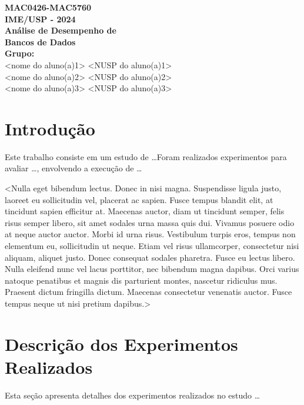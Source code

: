 \documentclass[12pt,a4paper]{article}
\begin{document}
\begin{titlepage}
    \centering
    \vspace*{\fill}
    
    {\Large \textbf{MAC0426-MAC5760} \\
    \textbf{IME/USP - 2024}} \\[1.5cm]
    
    {\huge \textbf{Análise de Desempenho de \\ Bancos de Dados}} \\[2cm]
    
    \textbf{Grupo:} \\[0.5cm]
    <nome do aluno(a)1> <NUSP do aluno(a)1> \\
    <nome do aluno(a)2> <NUSP do aluno(a)2> \\
    <nome do aluno(a)3> <NUSP do aluno(a)3>

    \vspace*{\fill}
\end{titlepage}

\section{Introdução}

Este trabalho consiste em um estudo de \dots Foram realizados experimentos para avaliar \dots , envolvendo a execução de \dots

<Nulla eget bibendum lectus. Donec in nisi magna. Suspendisse ligula justo, laoreet eu sollicitudin vel, placerat ac sapien. Fusce tempus blandit elit, at tincidunt sapien efficitur at. Maecenas auctor, diam ut tincidunt semper, felis risus semper libero, sit amet sodales urna massa quis dui. Vivamus posuere odio at neque auctor auctor. Morbi id urna risus. Vestibulum turpis eros, tempus non elementum eu, sollicitudin ut neque. Etiam vel risus ullamcorper, consectetur nisi aliquam, aliquet justo. Donec consequat sodales pharetra. Fusce eu lectus libero. Nulla eleifend nunc vel lacus porttitor, nec bibendum magna dapibus. Orci varius natoque penatibus et magnis dis parturient montes, nascetur ridiculus mus. Praesent dictum fringilla dictum. Maecenas consectetur venenatis auctor. Fusce tempus neque ut nisi pretium dapibus.>

\section{Descrição dos Experimentos Realizados}

Esta seção apresenta detalhes dos experimentos realizados no estudo \dots  
 
\end{document}

